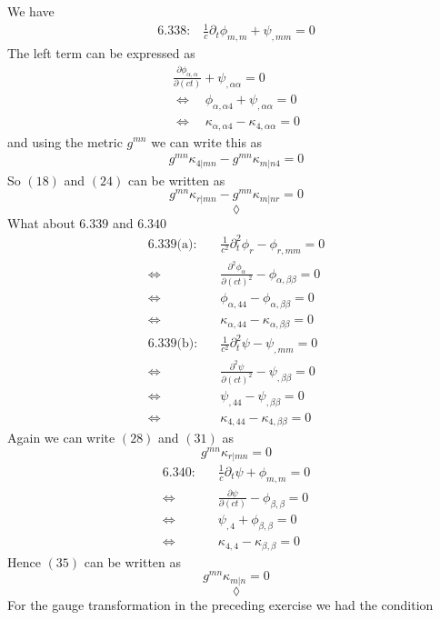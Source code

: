 We have 
\begin{align}\text{6.338:}\quad \frac{1}{c}\partial_t \phi_{m,m}+\psi_{,mm} = 0
\end{align} 
The left term can be expressed as 
\begin{align}
\frac{\partial \phi_{\alpha,\alpha}}{\partial (ct)}+ \psi_{,\alpha\alpha}=0\\
\Leftrightarrow\quad \phi_{\alpha,\alpha 4}+\psi_{,\alpha\alpha}=0\\
\Leftrightarrow\quad \kappa_{\alpha,\alpha 4}-\kappa_{4,\alpha\alpha}=0
\end{align}
and using the metric $g^{mn}$ we can write this as 
\begin{align}
g^{mn}\kappa_{4|mn}-g^{mn}\kappa_{m|n4}=0
\end{align}
So $(18)$ and $(24)$ can be written as
$$g^{mn}\kappa_{r|mn}-g^{mn}\kappa_{m|nr}=0$$
$$\lozenge$$
What about $\mathbf{6.339}$ and $\mathbf{6.340}$
\begin{align}
\text{6.339(a):}\quad &\frac{1}{c^2}\partial^2_t\phi_r -\phi_{r,mm}=0\\
\Leftrightarrow\quad &\frac{\partial^2\phi_{\alpha}}{\partial(ct)^2} -\phi_{\alpha,\beta\beta}=0\\
\Leftrightarrow\quad &\phi_{\alpha,44} -\phi_{\alpha,\beta\beta}=0\\
\Leftrightarrow\quad &\kappa_{\alpha,44} -\kappa_{\alpha,\beta\beta}=0\\
\text{6.339(b):}\quad &\frac{1}{c^2}\partial^2_t\psi -\psi_{,mm}=0\\
\Leftrightarrow\quad &\frac{\partial^2\psi}{\partial(ct)^2} -\psi_{,\beta\beta}=0\\
\Leftrightarrow\quad &\psi_{,44} -\psi_{,\beta\beta}=0\\
\Leftrightarrow\quad &\kappa_{4,44} -\kappa_{4,\beta\beta}=0
\end{align}
Again we can write $(28)$ and $(31)$ as 
$$g^{mn}\kappa_{r|mn}=0$$
\begin{align}
\text{6.340:}\quad &\frac{1}{c}\partial_t\psi +\phi_{m,m}=0\\
\Leftrightarrow\quad &\frac{\partial\psi}{\partial(ct)} -\phi_{\beta,\beta}=0\\
\Leftrightarrow\quad &\psi_{,4} +\phi_{\beta,\beta}=0\\
\Leftrightarrow\quad &\kappa_{4,4} -\kappa_{\beta,\beta}=0
\end{align}
Hence $(35)$ can be written as 
$$g^{mn}\kappa_{m|n}=0$$
$$\lozenge$$
For the gauge transformation in the preceding exercise we had the condition 

